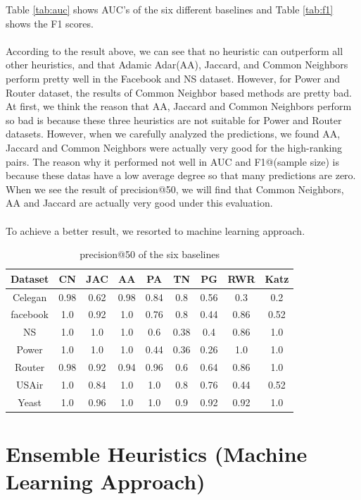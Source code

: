 \documentclass[12pt]{article}
\begin{document}
Table \ref{tab:auc} shows AUC's of the six different baselines and Table \ref{tab:f1} shows the F1 scores.
\\
\\
According to the result above, we can see that no heuristic can outperform all other heuristics, and that Adamic Adar(AA), Jaccard, and Common Neighbors perform pretty well in the Facebook and NS dataset. However, for Power and Router dataset, the results of Common Neighbor based methods are pretty bad. At first, we think the reason that AA, Jaccard and Common Neighbors perform so bad is because these three heuristics are not suitable for Power and Router datasets. However, when we carefully analyzed the predictions, we found AA, Jaccard and Common Neighbors were actually very good for the high-ranking pairs. The reason why it performed not well in AUC and F1@(sample size) is because these datas have a low average degree so that many predictions are zero. When we see the result of precision@50, we will find that Common Neighbors, AA and Jaccard are actually very good under this evaluation.
\\
\\
To achieve a better result, we resorted to machine learning approach.
\begin{table}
	\begin{center}
		\begin{tabular}{|c|c|c|c|c|c|c|c|c|}
			\hline
			Dataset & CN & JAC & AA & PA & TN & PG & RWR & Katz \\
			\hline
			Celegan&0.98&0.62&0.98&0.84&0.8&0.56&0.3&0.2\\
			facebook&1.0&0.92&1.0&0.76&0.8&0.44&0.86&0.52\\
			NS&1.0&1.0&1.0&0.6&0.38&0.4&0.86&1.0\\
			Power&1.0&1.0&1.0&0.44&0.36&0.26&1.0&1.0\\
			Router&0.98&0.92&0.94&0.96&0.6&0.64&0.86&1.0\\
			USAir&1.0&0.84&1.0&1.0&0.8&0.76&0.44&0.52\\
			Yeast&1.0&0.96&1.0&1.0&0.9&0.92&0.92&1.0\\
			\hline
		\end{tabular}
	\end{center}
	\caption{precision@50 of the six baselines}
	\label{tab:precision@50}
\end{table}



\section{Ensemble Heuristics (Machine Learning Approach)}
\end{document}
